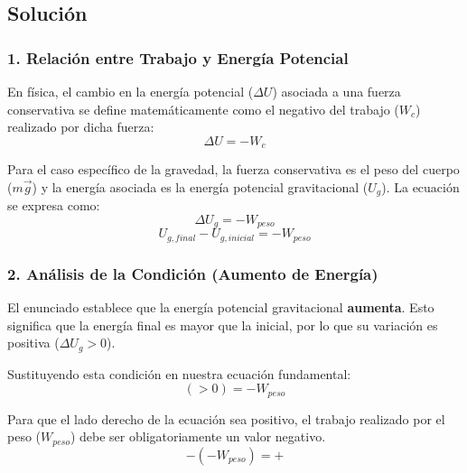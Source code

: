\documentclass[12pt, a4paper]{article}
\begin{document}
\subsection*{Solución}

\subsubsection*{1. Relación entre Trabajo y Energía Potencial}
En física, el cambio en la energía potencial ($\Delta U$) asociada a una fuerza conservativa se define matemáticamente como el negativo del trabajo ($W_c$) realizado por dicha fuerza:
$$\Delta U = -W_c$$

Para el caso específico de la gravedad, la fuerza conservativa es el peso del cuerpo ($m\vec{g}$) y la energía asociada es la energía potencial gravitacional ($U_g$). La ecuación se expresa como:
$$\Delta U_g = -W_{peso}$$
$$U_{g, final} - U_{g, inicial} = -W_{peso}$$

\subsubsection*{2. Análisis de la Condición (Aumento de Energía)}
El enunciado establece que la energía potencial gravitacional \textbf{aumenta}. Esto significa que la energía final es mayor que la inicial, por lo que su variación es positiva ($\Delta U_g > 0$).

Sustituyendo esta condición en nuestra ecuación fundamental:
$$(> 0) = -W_{peso}$$

Para que el lado derecho de la ecuación sea positivo, el trabajo realizado por el peso ($W_{peso}$) debe ser obligatoriamente un valor negativo. 
$$-(-W_{peso}) = +$$
\end{document}

